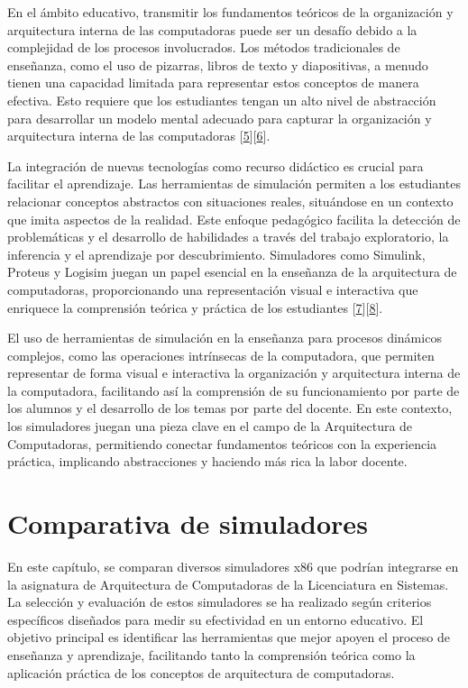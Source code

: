 \documentclass[12pt,twoside]{templates/unerthesis}
\begin{document}
En el ámbito educativo, transmitir los fundamentos teóricos de la organización y arquitectura interna de las computadoras puede ser un desafío debido a la complejidad de los procesos involucrados. Los métodos tradicionales de enseñanza, como el uso de pizarras, libros de texto y diapositivas, a menudo tienen una capacidad limitada para representar estos conceptos de manera efectiva. Esto requiere que los estudiantes tengan un alto nivel de abstracción para desarrollar un modelo mental adecuado para capturar la organización y arquitectura interna de las computadoras {[}\protect\hyperlink{ref-lion_simuladores_2005}{5}{]}{[}\protect\hyperlink{ref-contreras_uso_2010}{6}{]}.

La integración de nuevas tecnologías como recurso didáctico es crucial para facilitar el aprendizaje. Las herramientas de simulación permiten a los estudiantes relacionar conceptos abstractos con situaciones reales, situándose en un contexto que imita aspectos de la realidad. Este enfoque pedagógico facilita la detección de problemáticas y el desarrollo de habilidades a través del trabajo exploratorio, la inferencia y el aprendizaje por descubrimiento. Simuladores como Simulink, Proteus y Logisim juegan un papel esencial en la enseñanza de la arquitectura de computadoras, proporcionando una representación visual e interactiva que enriquece la comprensión teórica y práctica de los estudiantes {[}\protect\hyperlink{ref-garcia-garcia_pbbcache_2020}{7}{]}{[}\protect\hyperlink{ref-nova_tool_2013}{8}{]}.

El uso de herramientas de simulación en la enseñanza para procesos dinámicos complejos, como las operaciones intrínsecas de la computadora, que permiten representar de forma visual e interactiva la organización y arquitectura interna de la computadora, facilitando así la comprensión de su funcionamiento por parte de los alumnos y el desarrollo de los temas por parte del docente. En este contexto, los simuladores juegan una pieza clave en el campo de la Arquitectura de Computadoras, permitiendo conectar fundamentos teóricos con la experiencia práctica, implicando abstracciones y haciendo más rica la labor docente.

\hypertarget{comparativa-de-simuladores}{%
\chapter{Comparativa de simuladores}\label{comparativa-de-simuladores}}

En este capítulo, se comparan diversos simuladores x86 que podrían integrarse en la asignatura de Arquitectura de Computadoras de la Licenciatura en Sistemas. La selección y evaluación de estos simuladores se ha realizado según criterios específicos diseñados para medir su efectividad en un entorno educativo. El objetivo principal es identificar las herramientas que mejor apoyen el proceso de enseñanza y aprendizaje, facilitando tanto la comprensión teórica como la aplicación práctica de los conceptos de arquitectura de computadoras.
\end{document}
